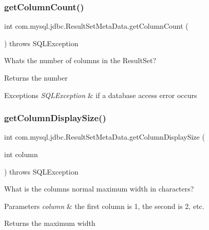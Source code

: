 \subsubsection{\texorpdfstring{get\+Column\+Count()}{getColumnCount()}}
{\footnotesize\ttfamily int com.\+mysql.\+jdbc.\+Result\+Set\+Meta\+Data.\+get\+Column\+Count (\begin{DoxyParamCaption}{ }\end{DoxyParamCaption}) throws S\+Q\+L\+Exception}

Whats the number of columns in the Result\+Set?

\begin{DoxyReturn}{Returns}
the number
\end{DoxyReturn}

\begin{DoxyExceptions}{Exceptions}
{\em S\+Q\+L\+Exception} & if a database access error occurs \\
\hline
\end{DoxyExceptions}
\mbox{\label{classcom_1_1mysql_1_1jdbc_1_1_result_set_meta_data_af69e95164eddfe6ae48d883703133485}} 
\subsubsection{\texorpdfstring{get\+Column\+Display\+Size()}{getColumnDisplaySize()}}
{\footnotesize\ttfamily int com.\+mysql.\+jdbc.\+Result\+Set\+Meta\+Data.\+get\+Column\+Display\+Size (\begin{DoxyParamCaption}\item[{int}]{column }\end{DoxyParamCaption}) throws S\+Q\+L\+Exception}

What is the column\textquotesingle{}s normal maximum width in characters?


\begin{DoxyParams}{Parameters}
{\em column} & the first column is 1, the second is 2, etc.\\
\hline
\end{DoxyParams}
\begin{DoxyReturn}{Returns}
the maximum width
\end{DoxyReturn}

